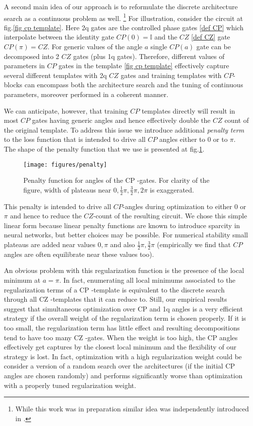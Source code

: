 \documentclass[amsfonts, amssymb, aps, nofootinbib, twocolumn]{revtex4-2}
\newcommand{\CZ}{CZ }
\newcommand{\CP}{CP }
\begin{document}
A second main idea of our approach is to reformulate the discrete architecture search as a continuous problem as well. \footnote{While this work was in preparation similar idea was independently introduced in \cite{Rakyta2022}.} For illustration, consider the circuit at fig.\ref{fig cp template}. Here 2q gates are the controlled phase gates \eqref{def CP} which interpolate between the identity gate $CP(0)=\mathbb{I}$ and the $CZ$ \eqref{def CZ} gate $CP(\pi)=CZ$. For generic values of the angle $a$ single $CP(a)$ gate can be decomposed into 2 $CZ$ gates (plus 1q gates). Therefore, different values of parameters in $CP$ gates in the template \eqref{fig cp template} effectively capture several different templates with 2q $CZ$ gates and training templates with $CP$-blocks can encompass both the architecture search and the tuning of continuous parameters, moreover performed in a coherent manner.

We can anticipate, however, that training $CP$ templates directly will result in most $CP$ gates having generic angles and hence effectively double the $CZ$ count of the original template. To address this issue we introduce additional \textit{penalty term} to the loss function that is intended to drive all $CP$ angles either to $0$ or to $\pi$. The shape of the penalty function that we use is presented at fig.\ref{fig penalty}.
\begin{figure}
\texttt{[image: figures/penalty]}
\caption{Penalty function for angles of the \CP-gates. For clarity of the figure, width of plateaus near $0,\frac12\pi, \frac32\pi, 2\pi$ is exaggerated.}
\label{fig penalty}
\end{figure}

This penalty is intended to drive all $CP$-angles during optimization to either $0$ or $\pi$ and hence to reduce the $CZ$-count of the resulting circuit. We chose this simple linear form because linear penalty functions are known to introduce sparcity \cite{} in neural networks, but better choices may be possible. For numerical stability small plateaus are added near values $0,\pi$ and also $\frac12\pi, \frac32\pi$  (empirically we find that $CP$ angles are often equilibrate near these values too).

An obvious problem with this regularization function is the presence of the local minimum at $a=\pi$. In fact, enumerating all local minimums associated to the regularization terms of a \CP-template is equivalent to the discrete search through all \CZ-templates that it can reduce to. Still, our empirical results suggest that simultaneous optimization over \CP and 1q angles is a very efficient strategy if the overall weight of the regularization term is chosen properly. If it is too small, the regularization term has little effect and resulting decompositions tend to have too many \CZ-gates. When the weight is too high, the \CP angles effectively get captures by the closest local minimum and the flexibility of our strategy is lost. In fact, optimization with a high regularization weight could be consider a version of a random search over the architectures (if the initial \CP angles are chosen randomly) and performs significantly worse than optimization with a properly tuned regularization weight.
\end{document}
